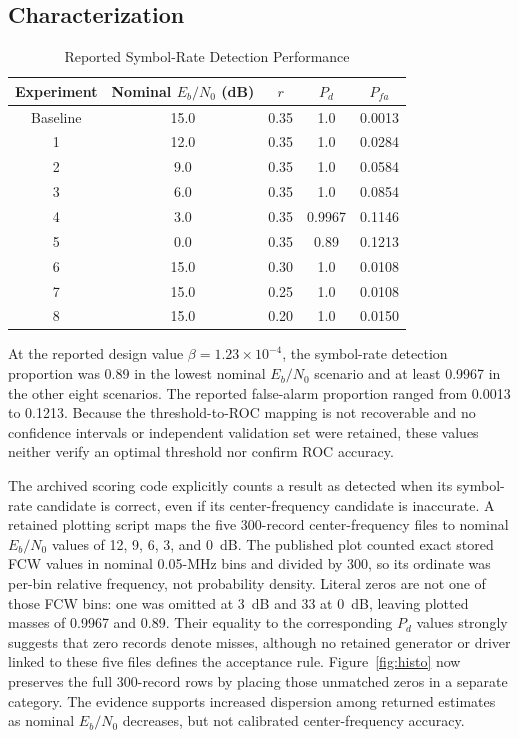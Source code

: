 \documentclass[conference]{IEEEtran}
\begin{document}
\subsection{Characterization}
\begin{table}[!t]
\caption{Reported Symbol-Rate Detection Performance}
\label{tab:performance}
\centering
\small
\setlength{\tabcolsep}{5pt}
\begin{tabular}{@{}ccccc@{}}
\toprule
Experiment & Nominal $E_b/N_0$ (dB) & $r$ & $P_d$ & $P_{fa}$ \\
\midrule
Baseline & 15.0 & 0.35 & 1.0    & 0.0013 \\
1        & 12.0 & 0.35 & 1.0    & 0.0284 \\
2        & 9.0  & 0.35 & 1.0    & 0.0584 \\
3        & 6.0  & 0.35 & 1.0    & 0.0854 \\
4        & 3.0  & 0.35 & 0.9967 & 0.1146 \\
5        & 0.0  & 0.35 & 0.89   & 0.1213 \\
6        & 15.0 & 0.30 & 1.0    & 0.0108 \\
7        & 15.0 & 0.25 & 1.0    & 0.0108 \\
8        & 15.0 & 0.20 & 1.0    & 0.0150 \\
\bottomrule
\end{tabular}
\end{table}

At the reported design value $\beta=1.23\times10^{-4}$, the symbol-rate detection proportion was 0.89 in the lowest nominal $E_b/N_0$ scenario and at least 0.9967 in the other eight scenarios. The reported false-alarm proportion ranged from 0.0013 to 0.1213. Because the threshold-to-ROC mapping is not recoverable and no confidence intervals or independent validation set were retained, these values neither verify an optimal threshold nor confirm ROC accuracy.

The archived scoring code explicitly counts a result as detected when its symbol-rate candidate is correct, even if its center-frequency candidate is inaccurate. A retained plotting script maps the five 300-record center-frequency files to nominal $E_b/N_0$ values of 12, 9, 6, 3, and 0~dB. The published plot counted exact stored FCW values in nominal 0.05-MHz bins and divided by 300, so its ordinate was per-bin relative frequency, not probability density. Literal zeros are not one of those FCW bins: one was omitted at 3~dB and 33 at 0~dB, leaving plotted masses of 0.9967 and 0.89. Their equality to the corresponding $P_d$ values strongly suggests that zero records denote misses, although no retained generator or driver linked to these five files defines the acceptance rule. Figure~\ref{fig:histo} now preserves the full 300-record rows by placing those unmatched zeros in a separate category. The evidence supports increased dispersion among returned estimates as nominal $E_b/N_0$ decreases, but not calibrated center-frequency accuracy.
\end{document}

